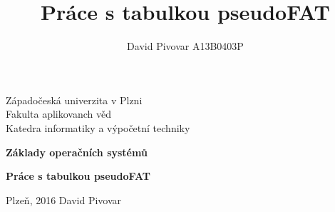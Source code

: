 \documentclass[12pt, a4paper]{report}
\title{Práce s tabulkou pseudoFAT}
\author{David Pivovar A13B0403P}
\begin{document}
\begin{titlepage}

\begin{center}
	
	{\fontsize{22}{0} \selectfont
		Západočeská univerzita v Plzni\\
		Fakulta aplikovanch věd\\
		Katedra informatiky a výpočetní techniky\\
	}
	
	\vfill
	\vfill
	
	{\fontsize{28}{0} \textbf{
		Základy operačních systémů
	}}
	
	\vfill
	
	{\fontsize{36}{0} \textbf{
		Práce s tabulkou pseudoFAT
	}}

\end{center}

\vfill
\vfill
\vfill
\vfill

\begin{flushleft}

	{\fontsize{16}{0} \selectfont
		Plzeň, 2016
		\hfill
		David Pivovar
	}
	
\end{flushleft}

\end{titlepage}


\tableofcontents




\end{document}
